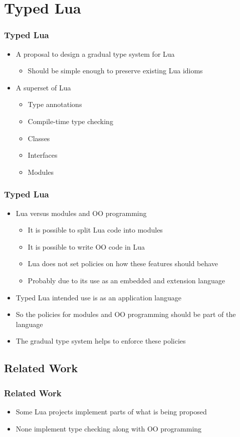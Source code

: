 \documentclass{beamer}
\begin{document}
\section{Typed Lua}
\begin{frame}
\frametitle{Typed Lua}
\begin{itemize}
\item A proposal to design a gradual type system for Lua
\begin{itemize}
\item Should be simple enough to preserve existing Lua idioms
\end{itemize}
\item A superset of Lua
\begin{itemize}
\item Type annotations
\item Compile-time type checking
\item Classes
\item Interfaces
\item Modules
\end{itemize}
\end{itemize}
\end{frame}

\begin{frame}
\frametitle{Typed Lua}
\begin{itemize}
\item Lua versus modules and OO programming
\begin{itemize}
\item It is possible to split Lua code into modules
\item It is possible to write OO code in Lua
\item Lua does not set policies on how these features should behave
\item Probably due to its use as an embedded and extension language
\end{itemize}
\item Typed Lua intended use is as an application language
\item So the policies for modules and OO programming should be
part of the language
\item The gradual type system helps to enforce these policies
\end{itemize}
\end{frame}

\subsection{Related Work}
\begin{frame}
\frametitle{Related Work}
\begin{itemize}
\item Some Lua projects implement parts of what is being proposed
\item None implement type checking along with OO programming
\end{itemize}
\end{frame}
\end{document}
